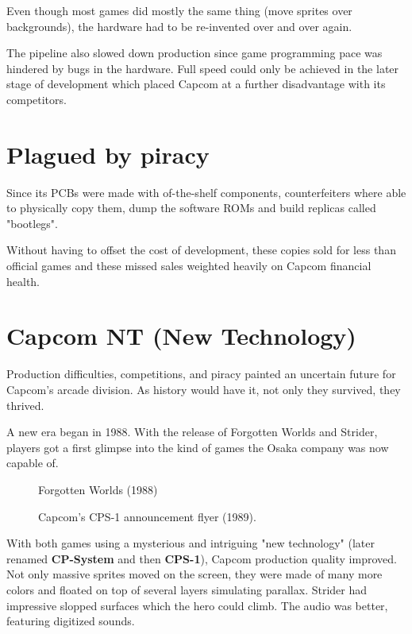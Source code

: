Even though most games did mostly the same thing (move sprites over backgrounds), the hardware had to be re-invented over and over again. 

The pipeline also slowed down production since game programming pace was hindered by bugs in the hardware. Full speed could only be achieved in the later stage of development which placed Capcom at a further disadvantage with its competitors.





\section{Plagued by piracy}
Since its PCBs were made with of-the-shelf components, counterfeiters where able to physically copy them, dump the software ROMs and build replicas called "bootlegs". 

Without having to offset the cost of development, these copies sold for less than official games and these missed sales weighted heavily on Capcom financial health. 




\section{Capcom NT (New Technology)}
Production difficulties, competitions, and piracy painted an uncertain future for Capcom's arcade division. As history would have it, not only they survived, they thrived.

A new era began in 1988. With the release of Forgotten Worlds and Strider, players got a first glimpse into the kind of games the Osaka company was now capable of.  



\label{nin_fw}
\begin{figure}[H]
\caption*{Forgotten Worlds (1988)}
\end{figure}



 
\label{fw_flyer}
  \begin{figure}[H]
  \caption*{Capcom's CPS-1 announcement flyer (1989).}
  \end{figure}

With both games using a mysterious and intriguing "new technology" (later renamed \textbf{CP-System} and then \textbf{CPS-1}), Capcom production quality improved. Not only massive sprites moved on the screen, they were made of many more colors and floated on top of several layers simulating parallax. Strider had impressive slopped surfaces which the hero could climb. The audio was better, featuring digitized sounds.

